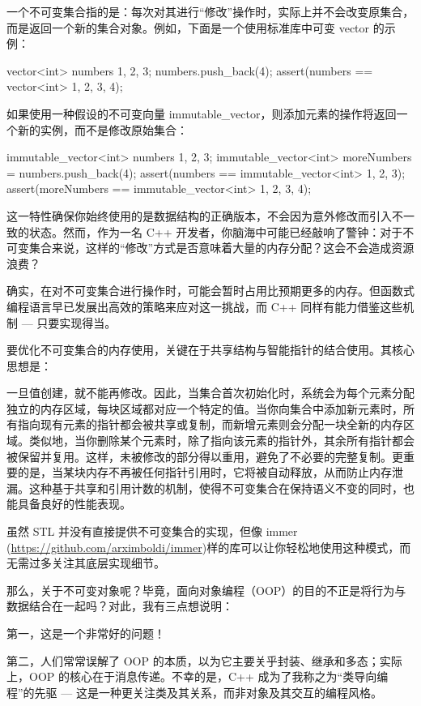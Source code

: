 一个不可变集合指的是：每次对其进行“修改”操作时，实际上并不会改变原集合，而是返回一个新的集合对象。例如，下面是一个使用标准库中可变 vector 的示例：

\begin{cpp}
vector<int> numbers {1, 2, 3};
numbers.push_back(4);
assert(numbers == vector<int> {1, 2, 3, 4});
\end{cpp}

如果使用一种假设的不可变向量 immutable\_vector，则添加元素的操作将返回一个新的实例，而不是修改原始集合：

\begin{cpp}
immutable_vector<int> numbers {1, 2, 3};
immutable_vector<int> moreNumbers = numbers.push_back(4);
assert(numbers == immutable_vector<int> {1, 2, 3});
assert(moreNumbers == immutable_vector<int> {1, 2, 3, 4});
\end{cpp}

这一特性确保你始终使用的是数据结构的正确版本，不会因为意外修改而引入不一致的状态。然而，作为一名 C++ 开发者，你脑海中可能已经敲响了警钟：对于不可变集合来说，这样的“修改”方式是否意味着大量的内存分配？这会不会造成资源浪费？

确实，在对不可变集合进行操作时，可能会暂时占用比预期更多的内存。但函数式编程语言早已发展出高效的策略来应对这一挑战，而 C++ 同样有能力借鉴这些机制 --- 只要实现得当。

要优化不可变集合的内存使用，关键在于共享结构与智能指针的结合使用。其核心思想是：

一旦值创建，就不能再修改。因此，当集合首次初始化时，系统会为每个元素分配独立的内存区域，每块区域都对应一个特定的值。当你向集合中添加新元素时，所有指向现有元素的指针都会被共享或复制，而新增元素则会分配一块全新的内存区域。类似地，当你删除某个元素时，除了指向该元素的指针外，其余所有指针都会被保留并复用。这样，未被修改的部分得以重用，避免了不必要的完整复制。更重要的是，当某块内存不再被任何指针引用时，它将被自动释放，从而防止内存泄漏。这种基于共享和引用计数的机制，使得不可变集合在保持语义不变的同时，也能具备良好的性能表现。

虽然 STL 并没有直接提供不可变集合的实现，但像 immer (\url{https://github.com/arximboldi/immer})样的库可以让你轻松地使用这种模式，而无需过多关注其底层实现细节。

那么，关于不可变对象呢？毕竟，面向对象编程（OOP）的目的不正是将行为与数据结合在一起吗？对此，我有三点想说明：

第一，这是一个非常好的问题！

第二，人们常常误解了 OOP 的本质，以为它主要关乎封装、继承和多态；实际上，OOP 的核心在于消息传递。不幸的是，C++ 成为了我称之为“类导向编程”的先驱 --- 这是一种更关注类及其关系，而非对象及其交互的编程风格。

